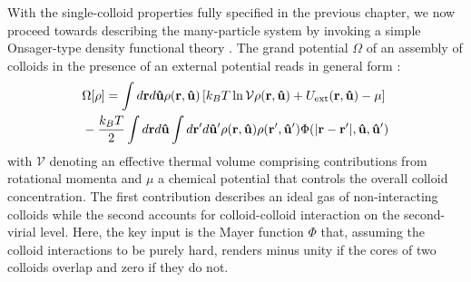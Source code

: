  With the single-colloid properties fully specified in the previous chapter, we now proceed towards describing the many-particle system by invoking a simple Onsager-type density functional theory \cite{onsager1949}. The grand potential $\Omega$ of an assembly of colloids in the presence of an external  potential  reads in general form \cite{allenevans}:
 \begin{align}
 &  \Omega[\rho ]  = \int d {\bf r} d {\bf \hat{u}}  \rho({\bf r}, {\bf \hat{u}}) \left [k_{B}T \ln {\mathcal V}   \rho({\bf r}, {\bf \hat{u}})  +   U_{\rm ext}({\bf r}, {\bf \hat{u}}) - \mu  \right ] \nonumber \\
 & -\frac{k_{B}T}{2} \int d {\bf r} d {\bf \hat{u}} \int d {\bf r}^{\prime} d {\bf \hat{u}}^{\prime}  \rho({\bf r}, {\bf \hat{u}})  \rho({\bf r}^{\prime}, {\bf \hat{u}}^{\prime}) \Phi(|{\bf r} - {\bf r}^{\prime}|, {\bf \hat{u}}, {\bf \hat{u}}^{\prime} )
 \label{grandpot}
 \end{align}
 with ${\mathcal V}$ denoting an effective thermal volume comprising contributions from rotational momenta and $\mu$ a chemical potential that controls the overall colloid concentration.  The first contribution describes an ideal gas of  non-interacting colloids while the second accounts for colloid-colloid interaction on the second-virial level. Here, the key input is the Mayer function $\Phi$  that, assuming the colloid interactions to be purely hard, renders minus unity if the cores of two colloids overlap and zero if they do not.

